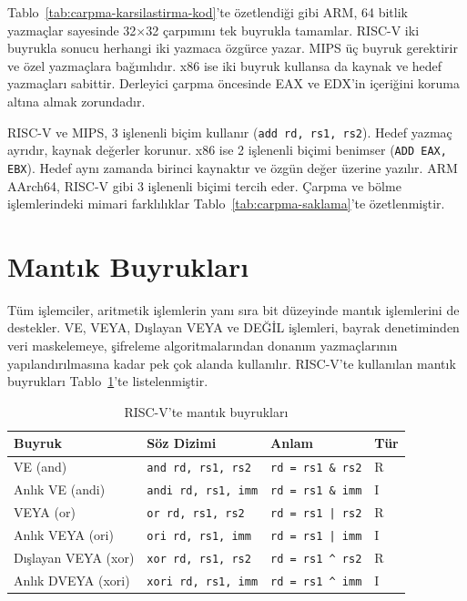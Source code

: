 \begin{ornek}[3.11]
Tablo~\ref{tab:carpma-karsilastirma-kod}'te özetlendiği gibi ARM, 64 bitlik yazmaçlar sayesinde 32$\times$32 çarpımını tek buyrukla tamamlar. RISC-V iki buyrukla sonucu herhangi iki yazmaca özgürce yazar. MIPS üç buyruk gerektirir ve özel yazmaçlara bağımlıdır. x86 ise iki buyruk kullansa da kaynak ve hedef yazmaçları sabittir. Derleyici çarpma öncesinde EAX ve EDX'in içeriğini koruma altına almak zorundadır.
\end{ornek}

\begin{karsilastirma}
RISC-V ve MIPS, 3 işlenenli biçim kullanır (\texttt{add rd, rs1, rs2}). Hedef yazmaç ayrıdır, kaynak değerler korunur. x86 ise 2 işlenenli biçimi benimser (\texttt{ADD EAX, EBX}). Hedef aynı zamanda birinci kaynaktır ve özgün değer üzerine yazılır. ARM AArch64, RISC-V gibi 3 işlenenli biçimi tercih eder. Çarpma ve bölme işlemlerindeki mimari farklılıklar Tablo~\ref{tab:carpma-saklama}'te özetlenmiştir.
\end{karsilastirma}

\section{Mantık Buyrukları}
\label{sec:mantik-buyruklar}

Tüm işlemciler, aritmetik işlemlerin yanı sıra bit düzeyinde mantık işlemlerini de destekler. VE, VEYA, Dışlayan VEYA ve DEĞİL işlemleri, bayrak denetiminden veri maskelemeye, şifreleme algoritmalarından donanım yazmaçlarının yapılandırılmasına kadar pek çok alanda kullanılır. RISC-V'te kullanılan mantık buyrukları Tablo~\ref{tab:mantik-buyruklar}'te listelenmiştir.

\begin{table}[H]
\centering
\caption{RISC-V'te mantık buyrukları}
\label{tab:mantik-buyruklar}
\begin{tabular}{llll}
\toprule
\textbf{Buyruk} & \textbf{Söz Dizimi} & \textbf{Anlam} & \textbf{Tür} \\
\midrule
VE (and)            & \texttt{and rd, rs1, rs2}   & \texttt{rd = rs1 \& rs2}      & R \\
Anlık VE (andi)     & \texttt{andi rd, rs1, imm}  & \texttt{rd = rs1 \& imm}      & I \\
VEYA (or)           & \texttt{or rd, rs1, rs2}    & \texttt{rd = rs1 | rs2}       & R \\
Anlık VEYA (ori)    & \texttt{ori rd, rs1, imm}   & \texttt{rd = rs1 | imm}       & I \\
Dışlayan VEYA (xor) & \texttt{xor rd, rs1, rs2}  & \texttt{rd = rs1 \^{} rs2}    & R \\
Anlık DVEYA (xori)  & \texttt{xori rd, rs1, imm} & \texttt{rd = rs1 \^{} imm}    & I \\
\bottomrule
\end{tabular}
\end{table}

